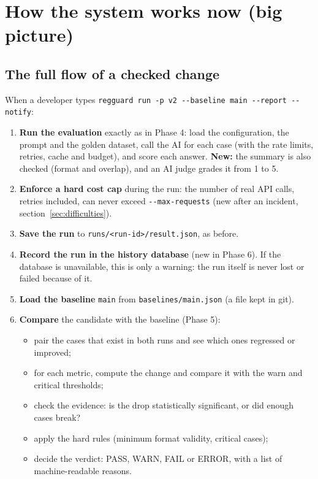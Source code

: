 \documentclass[11pt,a4paper]{article}
\newcommand{\code}[1]{\nolinkurl{#1}}
\begin{document}
\section{How the system works now (big picture)}

\subsection{The full flow of a checked change}

When a developer types
\texttt{regguard run -p v2 -{}-baseline main -{}-report -{}-notify}:
\begin{enumerate}
  \item \textbf{Run the evaluation} exactly as in Phase 4: load the configuration, the prompt
        and the golden dataset, call the AI for each case (with the rate limits, retries, cache
        and budget), and score each answer. \textbf{New:} the summary is also checked (format
        and overlap), and an AI judge grades it from 1 to 5.
  \item \textbf{Enforce a hard cost cap} during the run: the number of real API calls, retries
        included, can never exceed \texttt{-{}-max-requests} (new after an incident,
        section~\ref{sec:difficulties}).
  \item \textbf{Save the run} to \code{runs/<run-id>/result.json}, as before.
  \item \textbf{Record the run in the history database} (new in Phase 6). If the database is
        unavailable, this is only a warning: the run itself is never lost or failed because of it.
  \item \textbf{Load the baseline} \code{main} from \code{baselines/main.json} (a file kept in git).
  \item \textbf{Compare} the candidate with the baseline (Phase 5):
        \begin{itemize}
          \item pair the cases that exist in both runs and see which ones regressed or improved;
          \item for each metric, compute the change and compare it with the warn and critical thresholds;
          \item check the evidence: is the drop statistically significant, or did enough cases break?
          \item apply the hard rules (minimum format validity, critical cases);
          \item decide the verdict: PASS, WARN, FAIL or ERROR, with a list of machine-readable reasons.

\end{itemize}
\end{enumerate}
\end{document}
